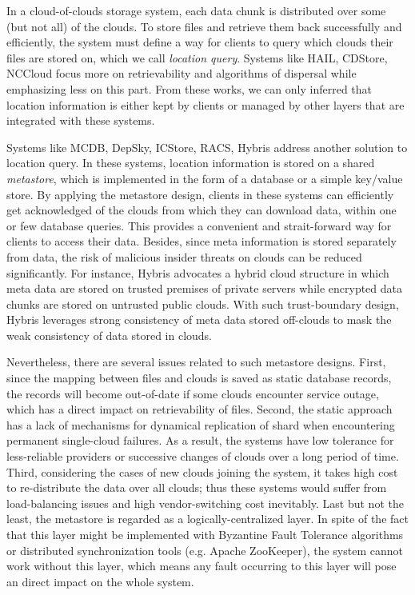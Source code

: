 In a cloud-of-clouds storage system, each data chunk is distributed over some (but not all) of the clouds. To store files and retrieve them back successfully and efficiently, the system must define a way for clients to query which clouds their files are stored on, which we call \textit{location query}. Systems like HAIL\cite{bowers2009hail}, CDStore\cite{li2015cdstore}, NCCloud\cite{hu2012nccloud} focus more on retrievability and algorithms of dispersal while emphasizing less on this part. From these works, we can only inferred that location information is either kept by clients or managed by other layers that are integrated with these systems.

Systems like MCDB\cite{alzain2011mcdb}, DepSky\cite{bessani2013depsky}, ICStore\cite{cachin2010dependable}, RACS\cite{abu2010racs}, Hybris\cite{dobre2014hybris} address another solution to location query. In these systems, location information is stored on a shared \textit{metastore}, which is implemented in the form of a database or a simple key/value store. By applying the metastore design, clients in these systems can efficiently get acknowledged of the clouds from which they can download data, within one or few database queries. This provides a convenient and strait-forward way for clients to access their data. Besides, since meta information is stored separately from data, the risk of malicious insider threats on clouds can be reduced significantly. For instance, Hybris\cite{dobre2014hybris} advocates a hybrid cloud structure in which meta data are stored on trusted premises of private servers while encrypted data chunks are stored on untrusted public clouds. With such trust-boundary design, Hybris leverages strong consistency of meta data stored off-clouds to mask the weak consistency of data stored in clouds.

Nevertheless, there are several issues related to such metastore designs. First, since the mapping between files and clouds is saved as static database records, the records will become out-of-date if some clouds encounter service outage, which has a direct impact on retrievability of files. Second, the static approach has a lack of mechanisms for dynamical replication of shard when encountering permanent single-cloud failures. As a result, the systems have low tolerance for less-reliable providers or successive changes of clouds over a long period of time. Third, considering the cases of new clouds joining the system, it takes high cost to re-distribute the data over all clouds; thus these systems would suffer from load-balancing issues and high vendor-switching cost inevitably. Last but not the least, the metastore is regarded as a logically-centralized layer. In spite of the fact that this layer might be implemented with Byzantine Fault Tolerance algorithms or distributed synchronization tools (e.g. Apache ZooKeeper\cite{zookeeper}), the system cannot work without this layer, which means any fault occurring to this layer will pose an direct impact on the whole system.

